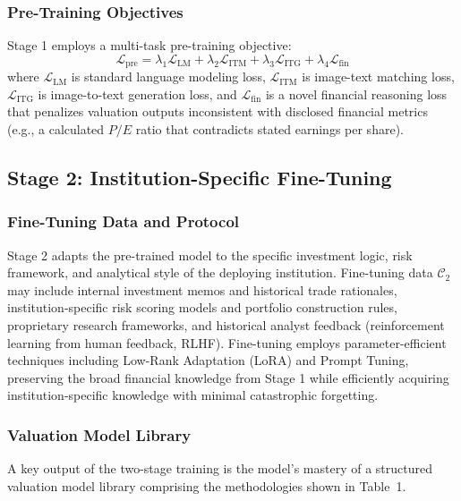 \documentclass[12pt,letterpaper]{article}
\begin{document}
\subsubsection{Pre-Training Objectives}

Stage 1 employs a multi-task pre-training objective:
\begin{equation}
  \mathcal{L}_{\text{pre}} =
  \lambda_1 \mathcal{L}_{\text{LM}} +
  \lambda_2 \mathcal{L}_{\text{ITM}} +
  \lambda_3 \mathcal{L}_{\text{ITG}} +
  \lambda_4 \mathcal{L}_{\text{fin}}
  \label{eq:pretrain}
\end{equation}
where $\mathcal{L}_{\text{LM}}$ is standard language modeling loss,
$\mathcal{L}_{\text{ITM}}$ is image-text matching loss,
$\mathcal{L}_{\text{ITG}}$ is image-to-text generation loss,
and $\mathcal{L}_{\text{fin}}$ is a novel financial reasoning loss
that penalizes valuation outputs inconsistent with disclosed financial
metrics (e.g., a calculated $P/E$ ratio that contradicts stated earnings
per share).

\subsection{Stage 2: Institution-Specific Fine-Tuning}

\subsubsection{Fine-Tuning Data and Protocol}

Stage 2 adapts the pre-trained model to the specific investment logic,
risk framework, and analytical style of the deploying institution.
Fine-tuning data $\mathcal{C}_2$ may include internal investment memos
and historical trade rationales, institution-specific risk scoring
models and portfolio construction rules, proprietary research frameworks,
and historical analyst feedback (reinforcement learning from human
feedback, RLHF).
Fine-tuning employs parameter-efficient techniques including Low-Rank
Adaptation (LoRA) \citep{hu2022} and Prompt Tuning, preserving the
broad financial knowledge from Stage 1 while efficiently acquiring
institution-specific knowledge with minimal catastrophic forgetting.

\subsubsection{Valuation Model Library}

A key output of the two-stage training is the model's mastery of a
structured valuation model library comprising the methodologies shown
in Table~1.
\end{document}
